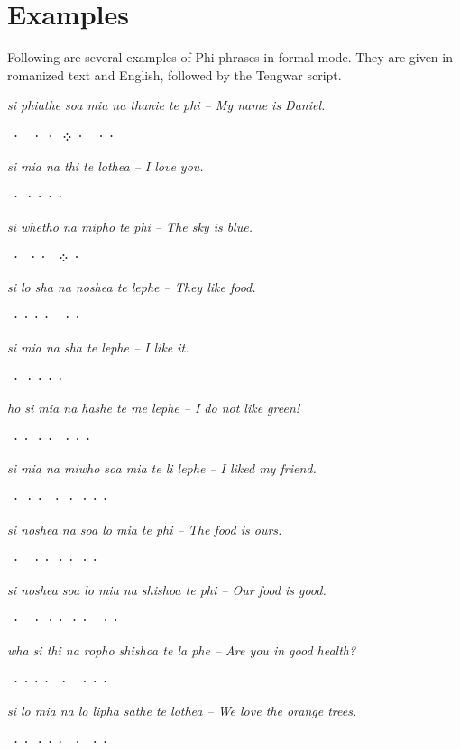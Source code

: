 \section{Examples}
Following are several examples of Phi phrases in formal mode. They are given in romanized text and English, followed by the Tengwar script.
\setlength{\parskip}{1.5em}

{\parindent0pt
\emph{si phiathe soa mia na thanie te phi -- My name is Daniel.}
\setlength{\parskip}{0.3em}

\ttm ⸱⸱⸱⁘⸱⸱⸱ \normalfont
\setlength{\parskip}{1.5em}

\emph{si mia na thi te lothea -- I love you.}
\setlength{\parskip}{0.3em}

\ttm ⸱⸱⸱⸱⸱ \normalfont
\setlength{\parskip}{1.5em}

\emph{si whetho na mipho te phi -- The sky is blue.}
\setlength{\parskip}{0.3em}

\ttm ⸱⸱⸱⁘⸱ \normalfont
\setlength{\parskip}{1.5em}

\emph{si lo sha na noshea te lephe -- They like food.}
\setlength{\parskip}{0.3em}

\ttm ⸱⸱⸱⸱⸱⸱ \normalfont
\setlength{\parskip}{1.5em}

\emph{si mia na sha te lephe -- I like it.}
\setlength{\parskip}{0.3em}

\ttm ⸱⸱⸱⸱⸱ \normalfont
\setlength{\parskip}{1.5em}

\emph{ho si mia na hashe te me lephe -- I do not like green!}
\setlength{\parskip}{0.3em}

\ttm ⸱⸱⸱⸱⸱⸱⸱ \normalfont
\setlength{\parskip}{1.5em}

\emph{si mia na miwho soa mia te li lephe -- I liked my friend.}
\setlength{\parskip}{0.3em}

\ttm ⸱⸱⸱⸱⸱⸱⸱⸱ \normalfont
\setlength{\parskip}{1.5em}

\emph{si noshea na soa lo mia te phi -- The food is ours.}
\setlength{\parskip}{0.3em}

\ttm ⸱⸱⸱⸱⸱⸱⸱ \normalfont

\clearpage
\emph{si noshea soa lo mia na shishoa te phi -- Our food is good.}
\setlength{\parskip}{0.3em}

\ttm ⸱⸱⸱⸱⸱⸱⸱⸱ \normalfont
\setlength{\parskip}{1.5em}

\emph{wha si thi na ropho shishoa te la phe -- Are you in good health?}
\setlength{\parskip}{0.3em}

\ttm ⸱⸱⸱⸱⸱⸱⸱⸱ \normalfont
\setlength{\parskip}{1.5em}

\emph{si lo mia na lo lipha sathe te lothea -- We love the orange trees.}
\setlength{\parskip}{0.3em}

\ttm ⸱⸱⸱⸱⸱⸱⸱⸱ \normalfont
\setlength{\parskip}{1em}
}
